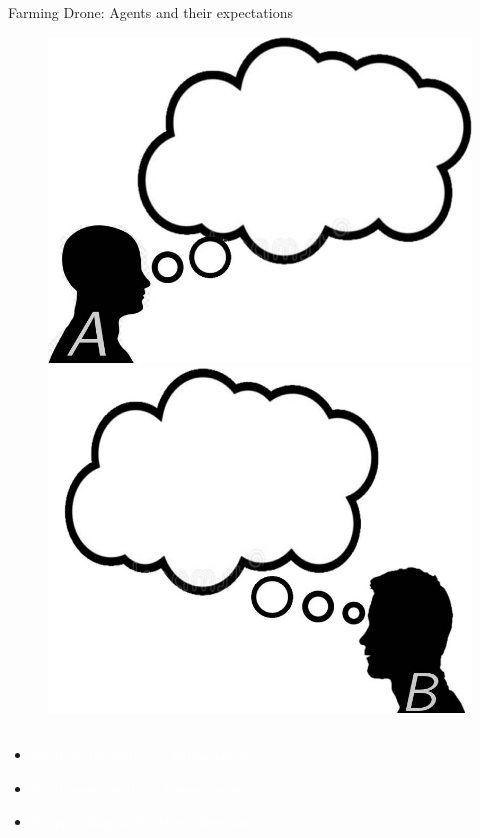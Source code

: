 \documentclass[usenames,dvipsnames]{beamer}
\begin{document}
\begin{frame}{Farming Drone: Agents and their expectations}
    \begin{figure}
        \centering
        \includegraphics[scale=0.2]{images/a-expects.jpg}
        \includegraphics[scale=0.2]{images/b-expects.jpg}
    \end{figure}
     \begin{columns} 
    \begin{column}{.5\textwidth}
    \begin{itemize}
        \item[\textcolor{white}{\textbullet}] \textcolor{white}{Go to water with $\leq 1$ wrong move.}
        \item[\textcolor{white}{\textbullet}] \textcolor{white}{Go to power with $\leq 1$ wrong move.}
        \item[\textcolor{white}{\textbullet}] \textcolor{white}{Go patrolling in clockwise direction.}
    \end{itemize}
    \end{column}
    \begin{column}{.5\textwidth}
        

\end{column}
\end{columns}
\end{frame}
\end{document}
